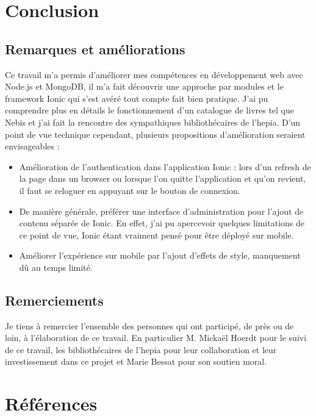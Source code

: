 \documentclass[a4paper, 12pt]{article}
\begin{document}
\section{Conclusion}
\subsection{Remarques et améliorations}
Ce travail m'a permis d'améliorer mes compétences en développement web avec Node.js et MongoDB, il m'a fait découvrir 
une approche par modules et le framework Ionic qui s'est avéré tout compte fait bien pratique. J'ai pu comprendre plus 
en détails le fonctionnement d'un catalogue de livres tel que Nebis et j'ai fait la rencontre des sympathiques bibliothécaires de 
l'hepia. D'un point de vue technique cependant, plusieurs propositions d'amélioration seraient envisageables :
\begin{itemize}
    \item Amélioration de l'authentication dans l'application Ionic : lors d'un refresh de la page dans un browser ou 
        lorsque l'on quitte l'application et qu'on revient, il faut se reloguer en appuyant sur le bouton de connexion.
    \item De manière générale, préférer une interface d'administration pour l'ajout de contenu séparée de Ionic. En 
        effet, j'ai pu apercevoir quelques limitations de ce point de vue, Ionic étant vraiment pensé pour être déployé 
        sur mobile.
    \item Améliorer l'expérience sur mobile par l'ajout d'effets de style, manquement dû au temps limité.
\end{itemize}
\subsection{Remerciements}
Je tiens à remercier l'ensemble des personnes qui ont participé, de près ou de loin, à l'élaboration de ce travail. En
particulier M. Mickaël Hoerdt pour le suivi de ce travail, les bibliothécaires de l'hepia pour leur collaboration et
leur investissement dans ce projet et Marie Bessat pour son soutien moral.

\newpage
\section{Références}


\end{document}
